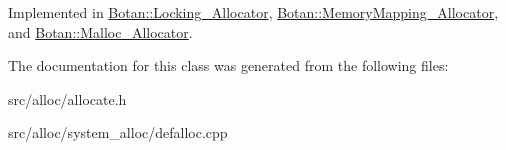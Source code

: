 Implemented in \hyperlink{classBotan_1_1Locking__Allocator_a184a544e406d641f288416c920df3440}{Botan\-::\-Locking\-\_\-\-Allocator}, \hyperlink{classBotan_1_1MemoryMapping__Allocator_a0ec1bd7d71ff4dff0bbb9c10f21b3b08}{Botan\-::\-Memory\-Mapping\-\_\-\-Allocator}, and \hyperlink{classBotan_1_1Malloc__Allocator_a9b14143c4852d304129e8c1f93faa9a1}{Botan\-::\-Malloc\-\_\-\-Allocator}.



The documentation for this class was generated from the following files\-:\begin{DoxyCompactItemize}
\item 
src/alloc/allocate.\-h\item 
src/alloc/system\-\_\-alloc/defalloc.\-cpp\end{DoxyCompactItemize}
